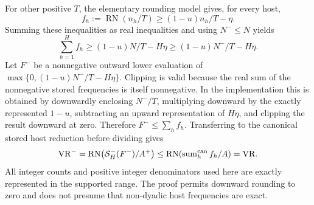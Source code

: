 \documentclass[11pt]{article}
\begin{document}
For other positive $T$, the elementary rounding model gives, for every host,
\begin{equation}
f_h:=\operatorname{RN}(n_h/T)\ge(1-u)n_h/T-\eta.
\end{equation}
Summing these inequalities as real inequalities and using $N^-\le N$ yields
\begin{equation}
\sum_{h=1}^Hf_h\ge(1-u)N/T-H\eta\ge(1-u)N^-/T-H\eta.
\label{eq:aggregate-frequency-real}
\end{equation}
Let $F^-$ be a nonnegative outward lower evaluation of $\max\{0,(1-u)N^-/T-H\eta\}$. Clipping is valid because the real sum of the nonnegative stored frequencies is itself nonnegative. In the implementation this is obtained by downwardly enclosing $N^-/T$, multiplying downward by the exactly represented $1-u$, subtracting an upward representation of $H\eta$, and clipping the result downward at zero. Therefore $F^-\le\sum_hf_h$. Transferring to the canonical stored host reduction before dividing gives
\begin{equation}
\mathrm{VR}^-=\operatorname{RN}\!\left(\mathcal S_H^-(F^-)/A^+\right)\le\operatorname{RN}\!\left(\operatorname{sum}^{\rm can}_hf_h/A\right)=\mathrm{VR}.
\label{eq:aggregate-vr-general}
\end{equation}
All integer counts and positive integer denominators used here are exactly represented in the supported range. The proof permits downward rounding to zero and does not presume that non-dyadic host frequencies are exact.
\end{document}
